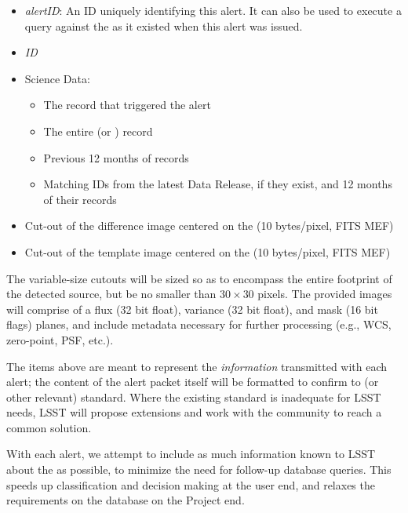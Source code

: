 \documentclass[SE,lsstdraft,toc]{lsstdoc}
\begin{document}
\begin{itemize}
    \item \emph{alertID}: An ID uniquely identifying this alert. It can also be used to execute a query against the \DB as it existed when this alert was issued.
    \item \emph{\DB ID}   %
    \item Science Data:
    \begin{itemize}
        \item The \DIASource record that triggered the alert
        \item The entire \DIAObject (or \SSObject) record
        \item Previous 12 months of \DIASource records
        \item Matching \Object IDs from the latest Data Release, if they exist, and 12 months of their \DIASource records
    \end{itemize}
    \item Cut-out of the difference image centered on the \DIASource (10 bytes/pixel, FITS MEF)
    \item Cut-out of the template image centered on the \DIASource (10 bytes/pixel, FITS MEF)
\end{itemize}

The variable-size cutouts will be sized so as to encompass the entire footprint of the detected source, but be no smaller than $30 \times 30$ pixels. The provided images will comprise of a flux (32 bit float), variance (32 bit float), and mask (16 bit flags) planes, and include metadata necessary for further processing (e.g., WCS, zero-point, PSF, etc.).

The items above are meant to represent the \emph{information} transmitted with each alert; the content of the alert packet itself will be formatted to confirm to \VOEvent (or other relevant) standard. Where the existing standard is inadequate for LSST needs, LSST will propose extensions and work with the community to reach a common solution.

With each alert, we attempt to include as much information known to LSST about the \DIASource as possible, to minimize the need for follow-up database queries. This speeds up classification and decision making at the user end, and relaxes the requirements on the database on the Project end.
\end{document}
